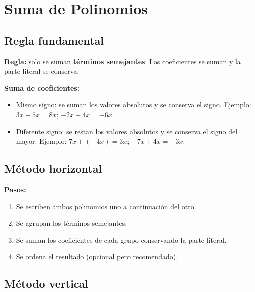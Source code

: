 \documentclass[12pt, letterpaper]{article}
\begin{document}
\section{Suma de Polinomios}

\subsection{Regla fundamental}

\begin{cuadroteoria}
  \textbf{Regla:} solo se suman \textbf{términos semejantes}. Los coeficientes se suman y la parte literal se conserva.

  \textbf{Suma de coeficientes:}
  \begin{itemize}[leftmargin=*]
    \item Mismo signo: se suman los valores absolutos y se conserva el signo. Ejemplo: $3x + 5x = 8x$; \quad $-2x - 4x = -6x$.
    \item Diferente signo: se restan los valores absolutos y se conserva el signo del mayor. Ejemplo: $7x + (-4x) = 3x$; \quad $-7x + 4x = -3x$.
  \end{itemize}
\end{cuadroteoria}

\subsection{Método horizontal}

\begin{cuadropasos}
  \textbf{Pasos:}
  \begin{enumerate}[leftmargin=*]
    \item Se escriben ambos polinomios uno a continuación del otro.
    \item Se agrupan los términos semejantes.
    \item Se suman los coeficientes de cada grupo conservando la parte literal.
    \item Se ordena el resultado (opcional pero recomendado).
  \end{enumerate}
\end{cuadropasos}

\subsection{Método vertical}
\end{document}
